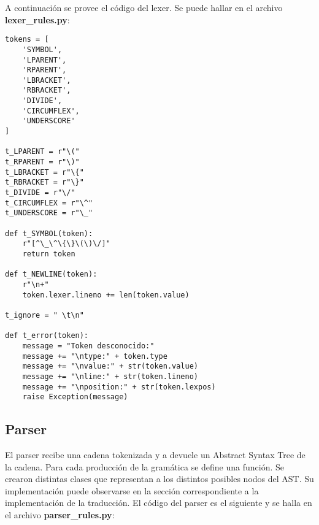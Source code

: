 \indent A continuación se provee el código del lexer. Se puede hallar en el archivo \textbf{lexer\_rules.py}:\\

\begin{verbatim}
tokens = [
	'SYMBOL',
	'LPARENT',
	'RPARENT',
	'LBRACKET',
	'RBRACKET',
	'DIVIDE',
	'CIRCUMFLEX',
	'UNDERSCORE'
]

t_LPARENT = r"\("
t_RPARENT = r"\)"
t_LBRACKET = r"\{"
t_RBRACKET = r"\}"
t_DIVIDE = r"\/"
t_CIRCUMFLEX = r"\^"
t_UNDERSCORE = r"\_"

def t_SYMBOL(token):
	r"[^\_\^\{\}\(\)\/]"
	return token

def t_NEWLINE(token):
    r"\n+"
    token.lexer.lineno += len(token.value)

t_ignore = " \t\n"

def t_error(token):
    message = "Token desconocido:"
    message += "\ntype:" + token.type
    message += "\nvalue:" + str(token.value)
    message += "\nline:" + str(token.lineno)
    message += "\nposition:" + str(token.lexpos)
    raise Exception(message)
\end{verbatim}

\subsection{Parser}

\indent \indent El parser recibe una cadena tokenizada y a devuele un Abstract Syntax Tree de la cadena. Para cada producción de la gramática se define una función. Se crearon distintas clases que representan a los distintos posibles nodos del AST. Su implementación puede observarse en la sección correspondiente a la implementación de la traducción. El código del parser es el siguiente y se halla en el archivo \textbf{parser\_rules.py}:\\

